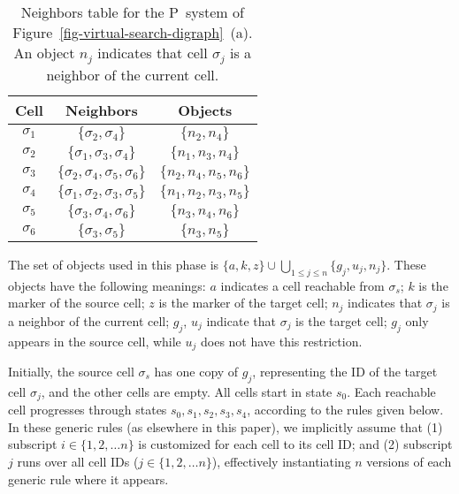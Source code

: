 \documentclass[preliminary,copyright,creativecommons]{eptcs}
\theoremstyle{remark}
\begin{document}
\setcounter{table}{\thefigure}
\begin{table}[ht] 
\caption{Neighbors table for the P~system of 
Figure~\ref{fig-virtual-search-digraph}~(a).
An object $n_j$ indicates that cell $\sigma_j$ is a neighbor of the current cell.}
\label{tab-neighbors}
\begin{center}
\begin{tabular}{ | c | c | c | } \hline
Cell & Neighbors & Objects \\ \hline 
$\sigma_1$ & $\{ \sigma_2, \sigma_4 \}$ & $\{ n_2, n_4 \}$ \\ \hline
$\sigma_2$ & $\{ \sigma_1, \sigma_3, \sigma_4 \}$ & $\{ n_1, n_3, n_4 \}$ \\ \hline
$\sigma_3$ & $\{ \sigma_2, \sigma_4, \sigma_5, \sigma_6 \}$ & $\{ n_2, n_4, n_5, n_6 \}$ \\ \hline
$\sigma_4$ & $\{ \sigma_1, \sigma_2, \sigma_3, \sigma_5 \}$ & $\{ n_1, n_2, n_3, n_5 \}$ \\ \hline
$\sigma_5$ & $\{ \sigma_3, \sigma_4, \sigma_6 \}$ & $\{ n_3, n_4, n_6 \}$ \\ \hline
$\sigma_6$ & $\{ \sigma_3, \sigma_5 \}$ & $\{ n_3, n_5 \}$ \\ \hline
\end{tabular}
\end{center}
\end{table} 
\addtocounter{figure}{1}

The set of objects used in this phase is 
$\{a, k, z\} \cup \bigcup_{1 \leq j \leq n} \{g_j, u_j, n_j\}$.
These objects have the following meanings:
$a$ indicates a cell reachable from $\sigma_s$;
$k$ is the marker of the source cell;
$z$ is the marker of the target cell;
$n_j$ indicates that $\sigma_j$ is a neighbor of the current cell;
$g_j$, $u_j$ indicate that $\sigma_j$ is the target cell;
$g_j$ only appears in the source cell, while $u_j$ does not have this restriction.

Initially, the source cell $\sigma_s$ has one copy of $g_j$, 
representing the ID of the target cell $\sigma_j$,
and the other cells are empty.
All cells start in state $s_0$.
Each reachable cell progresses through states $s_0, s_1, s_2, s_3, s_4$,
according to the rules given below.
In these generic rules (as elsewhere in this paper), we implicitly assume that
(1) subscript $i \in \{1,2,\dots n\}$ is customized for each cell to its cell ID;
and (2) subscript $j$ runs over all cell IDs ($j \in \{1,2,\dots n\}$),
effectively instantiating $n$ versions of each generic rule where it appears. 
\end{document}
